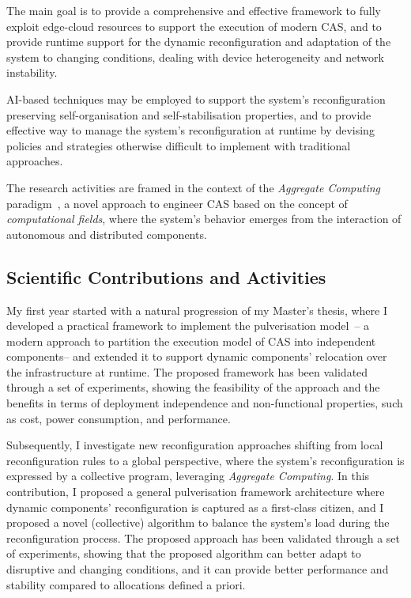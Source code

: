 \documentclass[runningheads]{llncs}
\begin{document}
The main goal is to provide a comprehensive and effective framework to fully exploit edge-cloud resources to support the execution of modern CAS,
and to provide runtime support for the dynamic reconfiguration and adaptation of the system to changing conditions,
dealing with device heterogeneity and network instability.

AI-based techniques may be employed to support the system's reconfiguration preserving self-organisation and self-stabilisation properties,
and to provide effective way to manage the system's reconfiguration at runtime by devising policies and strategies otherwise difficult to implement with traditional approaches.


The research activities are framed in the context of the \emph{Aggregate Computing} paradigm~\cite{DBLP:journals/computer/BealPV15},
a novel approach to engineer CAS based on the concept of \emph{computational fields},
where the system's behavior emerges from the interaction of autonomous and distributed components.

\subsection{Scientific Contributions and Activities}

My first year started with a natural progression of my Master's thesis,
where I developed a practical framework to implement the pulverisation model~\cite{DBLP:journals/fi/CasadeiPPVW20,DBLP:journals/iotj/CasadeiFPPSV22}--
a modern approach to partition the execution model of CAS into independent components--
and extended it to support dynamic components' relocation over the infrastructure at runtime.
%
The proposed framework has been validated through a set of experiments,
showing the feasibility of the approach and the benefits in terms of deployment independence and non-functional properties,
such as cost,
power consumption,
and performance.

Subsequently,
I investigate new reconfiguration approaches shifting from local reconfiguration rules to a global perspective,
where the system's reconfiguration is expressed by a collective program,
leveraging \emph{Aggregate Computing}.
%
In this contribution,
I proposed a general pulverisation framework architecture where dynamic components' reconfiguration is captured as a first-class citizen,
and I proposed a novel (collective) algorithm to balance the system's load during the reconfiguration process.
%
The proposed approach has been validated through a set of experiments,
showing that the proposed algorithm can better adapt to disruptive and changing conditions,
and it can provide better performance and stability compared to allocations defined a priori.
\end{document}
